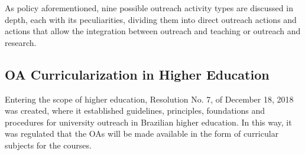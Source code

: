 
As policy aforementioned, nine possible outreach activity types are discussed in depth, each with its peculiarities, dividing them into direct outreach actions and actions that allow the integration between outreach and teaching or outreach and research.



\subsection{\acl{OA} Curricularization in Higher Education}\label{sec:3.1.1}

Entering the scope of higher education, Resolution No. 7, of December 18, 2018 \cite{ministerioSuperiorExtensao} was created, where it established guidelines, principles, foundations and procedures for university outreach in Brazilian higher education.
In this way, it was regulated that the \acp{OA} will be made available in the form of curricular subjects for the courses.


